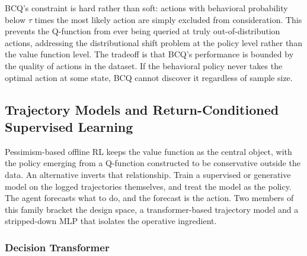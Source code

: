 BCQ's constraint is hard rather than soft: actions with behavioral probability below $\tau$ times the most likely action are simply excluded from consideration. This prevents the Q-function from ever being queried at truly out-of-distribution actions, addressing the distributional shift problem at the policy level rather than the value function level. The tradeoff is that BCQ's performance is bounded by the quality of actions in the dataset. If the behavioral policy never takes the optimal action at some state, BCQ cannot discover it regardless of sample size.

\subsection{Trajectory Models and Return-Conditioned Supervised Learning}
\label{sec:dt_rvs}

Pessimism-based offline RL keeps the value function as the central object, with the policy emerging from a Q-function constructed to be conservative outside the data. An alternative inverts that relationship. Train a supervised or generative model on the logged trajectories themselves, and treat the model as the policy. The agent forecasts what to do, and the forecast is the action. Two members of this family bracket the design space, a transformer-based trajectory model and a stripped-down MLP that isolates the operative ingredient.

\subsubsection{Decision Transformer}

